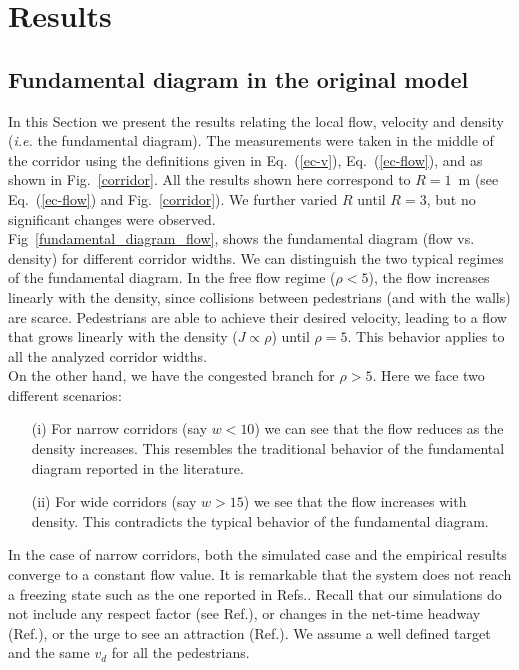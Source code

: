 \section{\label{results}Results}

\subsection{\label{fundamental_diagram} Fundamental diagram in the original model}

In this Section we present the results relating the local flow, velocity and density (\textit{i.e.} the fundamental diagram). The measurements were taken in the middle of the corridor using the definitions given in Eq.~(\ref{ec-v}), Eq.~(\ref{ec-flow}), and as shown in Fig.~\ref{corridor}. All the results shown here correspond to $R=1$~m (see Eq.~(\ref{ec-flow}) and Fig.~\ref{corridor}). We further varied $R$ until $R=3$, but no significant changes were observed. \\

Fig~\ref{fundamental_diagram_flow}, shows the fundamental diagram (flow vs. density) for different corridor widths. We can distinguish the two typical regimes of the fundamental diagram. In the free flow regime ($\rho < 5$), the flow increases linearly with the density, since collisions between pedestrians (and with the walls) are scarce. Pedestrians are able to achieve their desired velocity, leading to a flow that grows linearly with the density ($J \propto \rho$) until $\rho=5$. This behavior applies to all the analyzed corridor widths.\\

On the other hand, we have the congested branch  for $\rho > 5$. Here we face two different scenarios:

\begin{itemize}
\item[(i)] For narrow corridors (say $w < 10$) we can see that the flow reduces as the density increases. This resembles the traditional behavior of the fundamental diagram reported in the literature. 
\item[(ii)] For wide corridors (say $w > 15$) we see that the flow increases with density. This contradicts the typical behavior of the fundamental diagram.   
\end{itemize}

In the case of narrow corridors, both the simulated case and the empirical results converge to a constant flow value. It is remarkable that the system does not reach a freezing state such as the one reported in Refs.\cite{lin,kwak}. Recall that our simulations do not include any respect factor (see Ref.\cite{parisi2}), or changes in the net-time headway (Ref.\cite{helbing3}), or the urge to see an attraction (Ref.\cite{kwak}). We assume a well defined target and the same $v_d$ for all the pedestrians.\\

